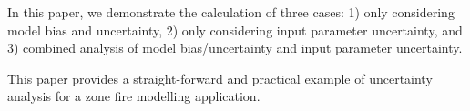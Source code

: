
In this paper, we demonstrate the calculation of three cases: 1) only considering model bias and uncertainty, 2) only considering input parameter uncertainty, and 3) combined analysis of model bias/uncertainty and input parameter uncertainty.


This paper provides a straight-forward and practical example of uncertainty analysis for a zone fire modelling application. 